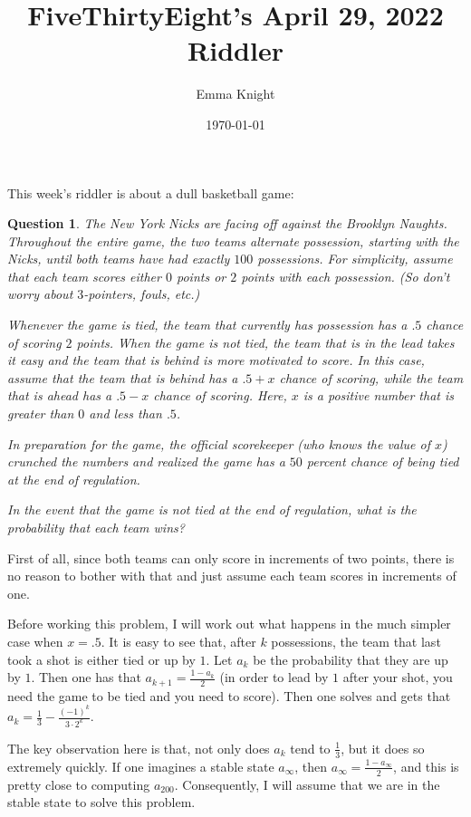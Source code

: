 \documentclass[11pt]{article}
\title{FiveThirtyEight's April 29, 2022 Riddler}
\author{Emma Knight}
\date{\today}
\newtheorem{question}[theorem]{Question}
\theoremstyle{definition}
\begin{document}
\maketitle
This week's riddler is about a dull basketball game:
\begin{question}
The New York Nicks are facing off against the Brooklyn Naughts. Throughout the entire game, the two teams alternate possession, starting with the Nicks, until both teams have had exactly $100$ possessions. For simplicity, assume that each team scores either $0$ points or $2$ points with each possession. (So don’t worry about $3$-pointers, fouls, etc.)

Whenever the game is tied, the team that currently has possession has a $.5$ chance of scoring $2$ points. When the game is not tied, the team that is in the lead takes it easy and the team that is behind is more motivated to score. In this case, assume that the team that is behind has a $.5+x$ chance of scoring, while the team that is ahead has a $.5-x$ chance of scoring. Here, $x$ is a positive number that is greater than $0$ and less than $.5$.

In preparation for the game, the official scorekeeper (who knows the value of $x$) crunched the numbers and realized the game has a $50$ percent chance of being tied at the end of regulation.

In the event that the game is not tied at the end of regulation, what is the probability that each team wins?
\end{question}
First of all, since both teams can only score in increments of two points, there is no reason to bother with that and just assume each team scores in increments of one.

Before working this problem, I will work out what happens in the much simpler case when $x = .5$.  It is easy to see that, after $k$ possessions, the team that last took a shot is either tied or up by $1$.  Let $a_k$ be the probability that they are up by $1$.  Then one has that $a_{k+1} = \frac{1-a_k}{2}$ (in order to lead by $1$ after your shot, you need the game to be tied and you need to score).  Then one solves and gets that $a_k = \frac{1}{3}- \frac{(-1)^k}{3\cdot2^k}$.

The key observation here is that, not only does $a_k$ tend to $\frac{1}{3}$, but it does so extremely quickly.  If one imagines a stable state $a_\infty$, then $a_\infty = \frac{1-a_\infty}{2}$, and this is pretty close to computing $a_{200}$.  Consequently, I will assume that we are in the stable state to solve this problem.
\end{document}
